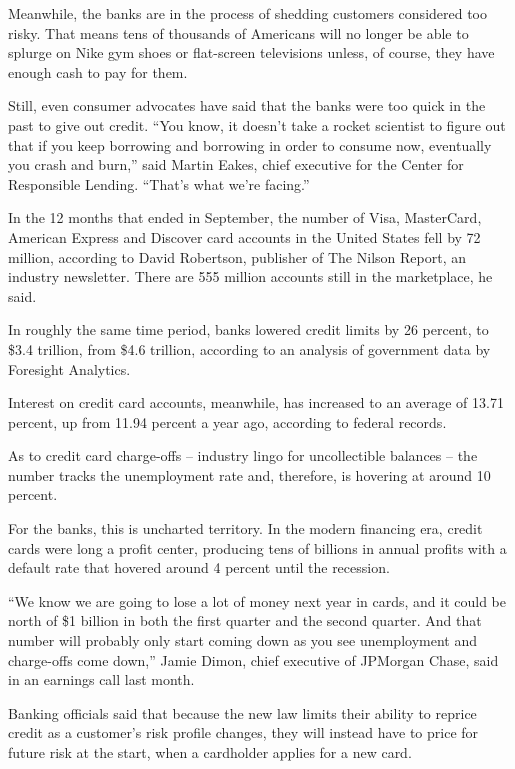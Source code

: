 ﻿\documentclass[12pt]{article}
\begin{document}
Meanwhile, the banks are in the process of shedding customers considered too risky. That means tens
of thousands of Americans will no longer be able to splurge on Nike gym shoes or flat-screen
televisions unless, of course, they have enough cash to pay for them.

Still, even consumer advocates have said that the banks were too quick in the past to give out
credit. ``You know, it doesn't take a rocket scientist to figure out that if you keep borrowing and
borrowing in order to consume now, eventually you crash and burn,'' said Martin Eakes, chief
executive for the Center for Responsible Lending. ``That's what we're facing.''

In the 12 months that ended in September, the number of Visa, MasterCard, American Express and
Discover card accounts in the United States fell by 72 million, according to David Robertson,
publisher of The Nilson Report, an industry newsletter. There are 555 million accounts still in the
marketplace, he said.

In roughly the same time period, banks lowered credit limits by 26 percent, to \$3.4 trillion, from
\$4.6 trillion, according to an analysis of government data by Foresight Analytics.

Interest on credit card accounts, meanwhile, has increased to an average of 13.71 percent, up from
11.94 percent a year ago, according to federal records.

As to credit card charge-offs -- industry lingo for uncollectible balances -- the number tracks the
unemployment rate and, therefore, is hovering at around 10 percent.

For the banks, this is uncharted territory. In the modern financing era, credit cards were long a
profit center, producing tens of billions in annual profits with a default rate that hovered around
4 percent until the recession.

``We know we are going to lose a lot of money next year in cards, and it could be north of \$1
billion in both the first quarter and the second quarter. And that number will probably only start
coming down as you see unemployment and charge-offs come down,'' Jamie Dimon, chief executive of
JPMorgan Chase, said in an earnings call last month.

Banking officials said that because the new law limits their ability to reprice credit as a
customer's risk profile changes, they will instead have to price for future risk at the start, when
a cardholder applies for a new card.
\end{document}
